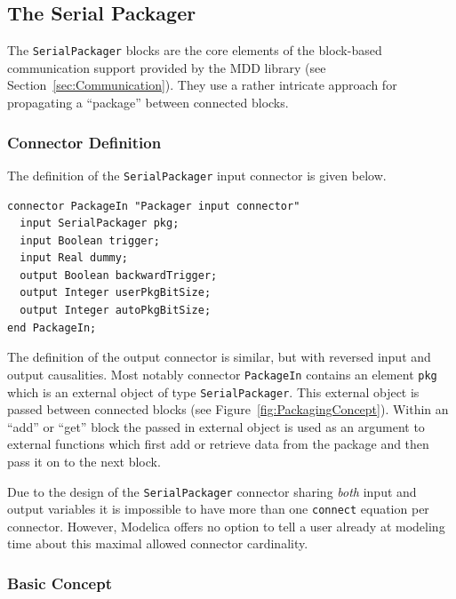 \documentclass{resources/modelica}
\newcommand{\modelica}[1]{\lstinline[language=modelica]|#1|}
\begin{document}
\subsection{The Serial Packager}
\label{sec:SerialPackager}

The \modelica{SerialPackager} blocks are the core elements of the block-based
communication support provided by the MDD library (see
Section~\ref{sec:Communication}). They use a rather intricate approach for
propagating a ``package'' between connected blocks.

\subsubsection{Connector Definition}

The definition of the \modelica{SerialPackager} input connector is given below.
\begin{lstlisting}[language=modelica]
connector PackageIn "Packager input connector"
  input SerialPackager pkg;
  input Boolean trigger;
  input Real dummy;
  output Boolean backwardTrigger;
  output Integer userPkgBitSize;
  output Integer autoPkgBitSize;
end PackageIn;
\end{lstlisting}
The definition of the output connector is similar, but with reversed input and
output causalities. Most notably connector \modelica{PackageIn} contains an
element \modelica{pkg} which is an external object of type \modelica{SerialPackager}.
This external object is passed between connected blocks (see
Figure~\ref{fig:PackagingConcept}). Within an ``add'' or ``get'' block the
passed in external object is used as an argument to external functions which
first add or retrieve data from the package and then pass it on to the next block.

Due to the design of the \modelica{SerialPackager} connector sharing \emph{both} input and output variables it is impossible to have more than one \modelica{connect} equation per connector.
However, Modelica offers no option to tell a user already at modeling time about this maximal allowed connector cardinality.

\subsubsection{Basic Concept}
\end{document}

